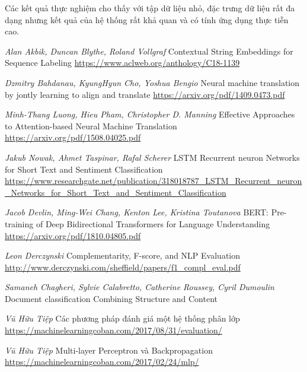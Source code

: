 \documentclass[14pt]{extreport}
\begin{document}
Các kết quả thực nghiệm cho thấy với tập dữ liệu nhỏ, đặc trưng dữ liệu rất đa dạng nhưng kết quả của hệ thống rất khả quan và có tính ứng dụng thực tiễn cao.
\newpage
\begin{thebibliography}{12}



\textit{Alan Akbik, Duncan Blythe, Roland Vollgraf
} Contextual String Embeddings for Sequence Labeling
\url{https://www.aclweb.org/anthology/C18-1139}

\textit{Dzmitry Bahdanau, KyungHyun Cho, Yoshua Bengio} Neural machine translation by jontly learning to align and translate
\url{https://arxiv.org/pdf/1409.0473.pdf}

\textit{Minh-Thang Luong, Hieu Pham, Christopher D. Manning} Effective Approaches to Attention-based Neural Machine Translation
\url{https://arxiv.org/pdf/1508.04025.pdf}

\textit{Jakub Nowak, Ahmet Taspinar, Rafal Scherer } LSTM Recurrent neuron Networks for Short Text and Sentiment Classification \\
\url{https://www.researchgate.net/publication/318018787_LSTM_Recurrent_neuron_Networks_for_Short_Text_and_Sentiment_Classification}

\textit{Jacob Devlin, Ming-Wei Chang, Kenton Lee, Kristina Toutanova } BERT: Pre-training of Deep Bidirectional Transformers for Language Understanding \\
\url{https://arxiv.org/pdf/1810.04805.pdf}

\textit{Leon Derczynski} Complementarity, F-score, and NLP Evaluation\\
\url{http://www.derczynski.com/sheffield/papers/f1_compl_eval.pdf}


\textit{Samaneh Chagheri, Sylvie Calabretto, Catherine Roussey, Cyril Dumoulin
} Document classification Combining Structure and Content 

\textit{Vũ Hữu Tiệp} Các phương pháp đánh giá một hệ thống phân lớp\\
\url{https://machinelearningcoban.com/2017/08/31/evaluation/}

\textit{Vũ Hữu Tiệp} Multi-layer Perceptron và Backpropagation
\url{https://machinelearningcoban.com/2017/02/24/mlp/}
\end{thebibliography}
\end{document}
